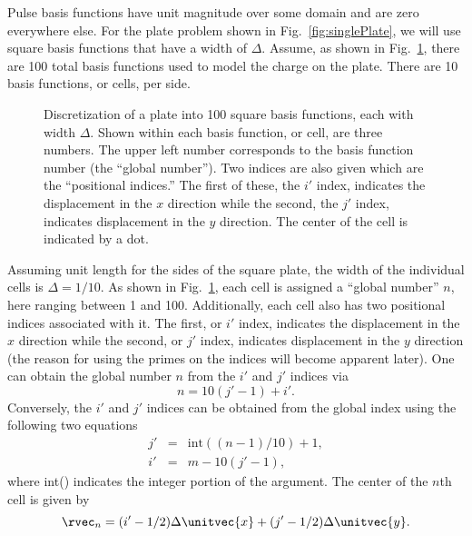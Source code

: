 Pulse basis functions have unit magnitude over some domain and are
zero everywhere else.  For the plate problem shown in
Fig.\ \ref{fig:singlePlate}, we will use square basis functions that
have a width of $\Delta$.  Assume, as shown in
Fig.\ \ref{fig:basisFunctions}, there are 100 total basis functions
used to model the charge on the plate.  There are 10 basis
functions, or cells, per side.
\begin{figure}
  \begin{center}
  \end{center} \caption{Discretization of a plate into 100 square
  basis functions, each with width $\Delta$.  Shown within each basis
  function, or cell, are three numbers.  The upper left number
  corresponds to the basis function number (the ``global number'').
  Two indices are also given which are the ``positional indices.''
  The first of these, the $i'$ index, indicates the displacement in
  the $x$ direction while the second, the $j'$ index, indicates
  displacement in the $y$ direction.  The center of the cell is
  indicated by a dot.}  \label{fig:basisFunctions}
\end{figure}
Assuming unit length for the sides of the square plate, the width of
the individual cells is $\Delta = 1/10$.  As shown in Fig.\
\ref{fig:basisFunctions}, each cell is assigned a ``global number''
$n$, here ranging between 1 and 100.  Additionally, each cell also has
two positional indices associated with it.  The first, or $i'$ index,
indicates the displacement in the $x$ direction while the second, or
$j'$ index, indicates displacement in the $y$ direction (the reason
for using the primes on the indices will become apparent later).  One
can obtain the global number $n$ from the $i'$ and $j'$ indices via
\begin{equation}
  n = 10(j'-1) + i'.
\end{equation}
Conversely, the $i'$ and $j'$ indices can be obtained from the global
index using the following two equations
\begin{eqnarray}
  j' &=& \mbox{int}((n-1)/10) + 1, \label{eq:jFromGlobal} \\
  i' &=& m - 10(j'-1), \label{eq:iFromGlobal}
\end{eqnarray}
where int() indicates the integer portion of the argument.  
The center
of the $n$th cell is given by
\begin{equation}
  \rvec_n = (i'-1/2)\Delta \unitvec{x} +  (j'-1/2)\Delta \unitvec{y}.
  \label{eq:centers}
\end{equation}
